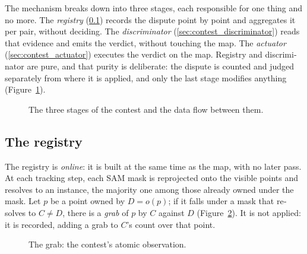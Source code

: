 \begin{otherlanguage}{english}
The mechanism breaks down into three stages, each responsible for one thing and no more. The
\emph{registry} (\ref{sec:contest_registry}) records the dispute point by point and aggregates it per
pair, without deciding. The \emph{discriminator} (\ref{sec:contest_discriminator}) reads that
evidence and emits the verdict, without touching the map. The \emph{actuator}
(\ref{sec:contest_actuator}) executes the verdict on the map. Registry and discriminator are pure,
and that purity is deliberate: the dispute is counted and judged separately from where it is applied,
and only the last stage modifies anything (Figure~\ref{fig:contest_pipeline}).

\begin{figure}[ht]
  \centering
  \caption{The three stages of the contest and the data flow between them.}
  \label{fig:contest_pipeline}
\end{figure}

\subsection{The registry}
\label{sec:contest_registry}

The registry is \emph{online}: it is built at the same time as the map, with no later pass. At each
tracking step, each SAM mask is reprojected onto the visible points and resolves to an instance, the
majority one among those already owned under the mask. Let $p$ be a point owned by $D = o(p)$; if it
falls under a mask that resolves to $C \neq D$, there is a \emph{grab} of $p$ by $C$ against $D$
(Figure~\ref{fig:contest_grab}). It is not applied: it is recorded, adding a grab to $C$'s count over
that point.

\begin{figure}[ht]
  \centering
  \caption{The grab: the contest's atomic observation.}
  \label{fig:contest_grab}
\end{figure}


\end{otherlanguage}
